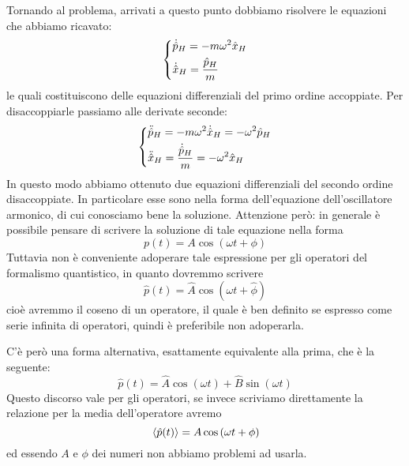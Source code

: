 \begin{soluzione}
   \vspace{0.2cm}Tornando al problema, arrivati a questo punto dobbiamo risolvere le equazioni che abbiamo ricavato:
   \begin{equation*}
      \begin{dcases}
         \dot{\hat{p}}_H
         =-m\omega^2 \hat{x}_H\\
         \dot{\hat{x}}_H
         =\frac{\hat{p}_H}{m}
      \end{dcases}
   \end{equation*}
   le quali costituiscono delle equazioni differenziali del primo ordine accoppiate. Per disaccoppiarle passiamo alle derivate seconde:
   \begin{equation*}
      \begin{dcases}
         \ddot{\hat{p}}_H
         =-m\omega^2 \dot{\hat{x}}_H
         =-\omega^2\hat{p}_H\\
         \ddot{\hat{x}}_H
         =\frac{\dot{\hat{p}}_H}{m}
         =-\omega^2\hat{x}_H
      \end{dcases}
   \end{equation*}
   In questo modo abbiamo ottenuto due equazioni differenziali del secondo ordine disaccoppiate. In particolare esse sono nella forma dell'equazione dell'oscillatore armonico, di cui conosciamo bene la soluzione. Attenzione però: in generale è possibile pensare di scrivere la soluzione di tale equazione nella forma
   \begin{equation*}
      p(t)=A\cos{(\omega t + \phi)}
   \end{equation*}
   Tuttavia non è conveniente adoperare tale espressione per gli operatori del formalismo quantistico, in quanto dovremmo scrivere
   \begin{equation*}
      \hat{p}(t)=\hat{A}\cos{(\omega t + \hat{\phi})}
   \end{equation*}
   cioè avremmo il coseno di un operatore, il quale è ben definito se espresso come serie infinita di operatori, quindi è preferibile non adoperarla.

   C'è però una forma alternativa, esattamente equivalente alla prima, che è la seguente:
   \begin{equation*}
      \hat{p}(t)
      =\hat{A}\cos{(\omega t)} + \hat{B}\sin{(\omega t)}
   \end{equation*}
   Questo discorso vale per gli operatori, se invece scriviamo direttamente la relazione per la media dell'operatore avremo
   \begin{equation*}
      \expval*{\hat{p}(t)}
      =A\cos{(\omega t + \phi)}
   \end{equation*}
   ed essendo $A$ e $\phi$ dei numeri non abbiamo problemi ad usarla.
   

\end{soluzione}
